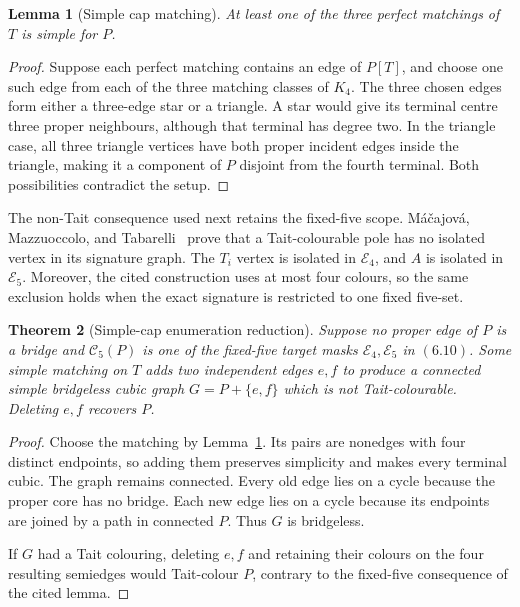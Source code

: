 \documentclass[11pt]{article}
\newtheorem{theorem}{Theorem}[section]
\newtheorem{lemma}[theorem]{Lemma}
\theoremstyle{definition}
\theoremstyle{remark}
\begin{document}
\begin{lemma}[Simple cap matching]\label{lem:simple-cap-matching}
At least one of the three perfect matchings of \(T\) is simple for
\(P\).
\end{lemma}

\begin{proof}
Suppose each perfect matching contains an edge of \(P[T]\), and choose
one such edge from each of the three matching classes of \(K_4\).  The
three chosen edges form either a three-edge star or a triangle.  A star
would give its terminal centre three proper neighbours, although that
terminal has degree two.  In the triangle case, all three triangle
vertices have both proper incident edges inside the triangle, making
it a component of \(P\) disjoint from the fourth terminal.  Both
possibilities contradict the setup.
\end{proof}

The non-Tait consequence used next retains the fixed-five scope.
M\'a\v cajov\'a, Mazzuoccolo, and
Tabarelli~\cite[Lemma 3.8]{MacajovaEtAl2026} prove that a
Tait-colourable pole has no isolated vertex in its signature graph.  The \(T_i\) vertex is
isolated in \(\mathcal E_4\), and \(A\) is isolated in
\(\mathcal E_5\).  Moreover, the cited construction uses at most four
colours, so the same exclusion holds when the exact signature is
restricted to one fixed five-set.

\begin{theorem}[Simple-cap enumeration reduction]
\label{thm:simple-cap-reduction}
Suppose no proper edge of \(P\) is a bridge and
\(\mathcal C_5(P)\) is one of the fixed-five target masks
\(\mathcal E_4,\mathcal E_5\) in \((6.10)\).  Some simple matching on
\(T\) adds two independent edges \(e,f\) to produce a connected simple
bridgeless cubic graph \(G=P+\{e,f\}\) which is not Tait-colourable.
Deleting \(e,f\) recovers \(P\).
\end{theorem}

\begin{proof}
Choose the matching by Lemma~\ref{lem:simple-cap-matching}.  Its pairs
are nonedges with four distinct endpoints, so adding them preserves
simplicity and makes every terminal cubic.  The graph remains
connected.  Every old edge lies on a cycle because the proper core has
no bridge.  Each new edge lies on a cycle because its endpoints are
joined by a path in connected \(P\).  Thus \(G\) is bridgeless.

If \(G\) had a Tait colouring, deleting \(e,f\) and retaining their
colours on the four resulting semiedges would Tait-colour \(P\),
contrary to the fixed-five consequence of the cited lemma.
\end{proof}
\end{document}
